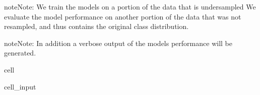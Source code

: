 \documentclass[letterpaper,10pt,english]{jupyterBook}
\begin{document}
\begin{sphinxadmonition}{note}{Note:}
\sphinxAtStartPar
We train the models on a portion of the data that is under\sphinxhyphen{}sampled
We evaluate the model performance on another portion of the data that was not resampled, and thus contains the original class distribution.
\end{sphinxadmonition}

\begin{sphinxadmonition}{note}{Note:}
\sphinxAtStartPar
In addition a verbose output of the models performance will be generated.
\end{sphinxadmonition}

\begin{sphinxuseclass}{cell}\begin{sphinxVerbatimInput}

\begin{sphinxuseclass}{cell_input}
\begin{sphinxVerbatim}[commandchars=\\\{\}]
  

     


     

     


\end{sphinxVerbatim}
\end{sphinxuseclass}
\end{sphinxVerbatimInput}
\end{sphinxuseclass}
\end{document}
